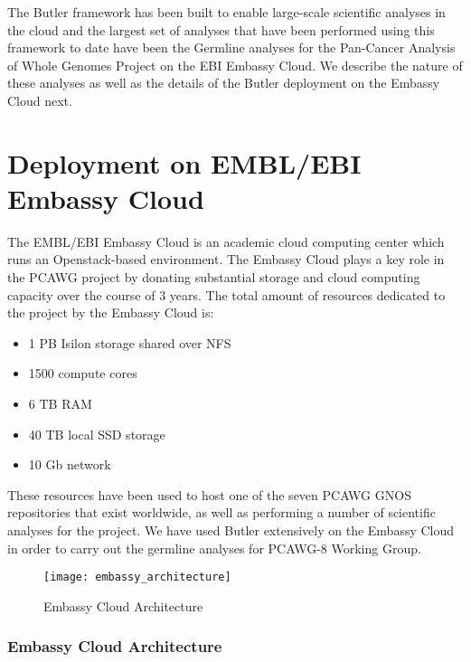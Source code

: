 The Butler framework has been built to enable large-scale scientific analyses in the cloud and the largest set of analyses that have been performed using this framework to date have been the Germline analyses for the Pan-Cancer Analysis of Whole Genomes Project on the EBI Embassy Cloud. We describe the nature of these analyses as well as the details of the Butler deployment on the Embassy Cloud next.

\section{Deployment on EMBL/EBI Embassy Cloud}

The EMBL/EBI Embassy Cloud\autocite{cook2016european} is an academic cloud computing center which runs an Openstack-based environment. The Embassy Cloud plays a key role in the PCAWG project by donating substantial storage and cloud computing capacity over the course of 3 years. The total amount of resources dedicated to the project by the Embassy Cloud is:

\begin{itemize}
\item 1 PB Isilon storage shared over NFS
\item 1500 compute cores
\item 6 TB RAM
\item 40 TB local SSD storage
\item 10 Gb network
\end{itemize}

These resources have been used to host one of the seven PCAWG GNOS repositories that exist worldwide, as well as performing a number of scientific analyses for the project. We have used Butler extensively on the Embassy Cloud in order to carry out the germline analyses for PCAWG-8 Working Group.

\begin{figure}[H]
\texttt{[image: embassy\_architecture]}
\centering
\caption {Embassy Cloud Architecture}
\label{fig:embassy_architecture}
\end{figure}

\subsubsection{Embassy Cloud Architecture}

